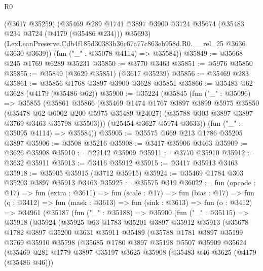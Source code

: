 \begin{lexlean}{R0}
\begin{coremodule}
        (@3617 @35259)
        (@35469
          @289
          @1741
          @3897
          @3900
          @3724
          @35674
          (@35483 @234 @3724 (@4179 (@35486 @234)))
          @35693)
        (LexLeanPreserve.Cdb4f185d30383b36c67a77c863eb958d.R0.__rel_25 @3636 @3630 @3639))
      (fun ("_" : @35078 @4114) => @35584))
@35849 := @35668 @245 @1769 @6289 @35231
@35850 := @3770 @3463
@35851 := @5976 @35850
@35855 := @35849 (@3629 @35851) (@3617 @35239)
@35856 := @35469 @283
@35861 := @35856 @1768 @3897 @3900 @3628 @35851
@35866 := @35483 @62 @3628 (@4179 (@35486 @62))
@35900 := @35224
    (@35845
      (fun ("_" : @35096) =>
      @35855
        (@35861
          @35866
          (@35469
            @1474
            @1767
            @3897
            @3899
            @5975
            @35850
            (@35478 @62 @6002 @200 @5975 @35489 @24027)
            (@35788 @303 @3897 @3897 @3769 @3463 @35798 @35503)))
        (@25454 @3627 @5974 @3633))
      (fun ("_" : @35095 @4114) => @35584))
@35905 := @35575 @669 @213 @1786 @35205 @3897
@35906 := @3508 @35216
@35908 := @3417 @35906 @3463
@35909 := @3626 @35908
@35910 := @22142 @35909
@35911 := @3770 @35910
@35912 := @3632 @35911
@35913 := @3416 @35912
@35915 := @3417 @35913 @3463
@35918 := @35905 @35915 (@3712 @35915)
@35924 := @35469 @1784 @303 @35203 @3897 @35913 @3463
@35925 := @35575 @319
@36022 := fun (opcode : @17) =>
  fun (extra : @3611) =>
  fun (scale : @17) =>
  fun (bias : @17) =>
  fun (q : @3412) =>
  fun (mask : @3613) =>
  fun (sink : @3613) =>
  fun (o : @3412) =>
  @34961
    (@35187
      (fun ("_" : @35188) =>
      @35900
        (fun ("_" : @35115) =>
        @35918
          (@35924
            (@35925
              @63
              @1783
              @35201
              @3897
              @35912
              @35913
              (@35678
                @1782
                @3897
                @35200
                @3631
                @35911
                @35489
                (@35788
                  @1781
                  @3897
                  @35199
                  @3769
                  @35910
                  @35798
                  (@35685
                    @1780
                    @3897
                    @35198
                    @5507
                    @35909
                    @35624
                    (@35469
                      @281
                      @1779
                      @3897
                      @35197
                      @3625
                      @35908
                      (@35483 @46 @3625 (@4179 (@35486 @46)))

\end{coremodule}
\end{lexlean}
